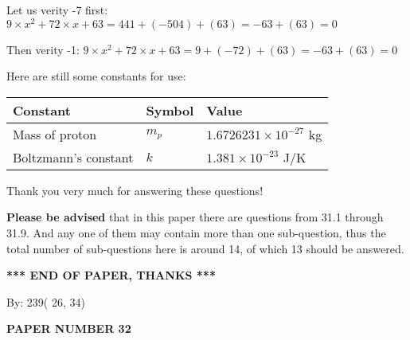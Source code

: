 \documentclass[12pt]{article}
\begin{document}
Let us verity  %
-7 first:
$  %
9 \times x^2  %
+  %
72
                 \times x    %
+  %
63
  = %
441+( %
-504)+( %
63)
  = %
-63+( %
63)
  = %
0
$
 
Then verity  %
-1:
$  %
9 \times x^2  %
+  %
72
                 \times x    %
+  %
63
  = %
9+( %
-72)+( %
63)
  = %
-63+( %
63)
  = %
0
$
 
 
 
   
   
 \vspace{0.2in}
Here are still some constants for use:
 
 
\noindent\begin{tabular}{|l|l|l|}
\hline
Constant & Symbol & Value \\
\hline
 
Mass of proton &
$m_p$ &
 $ 1.6726231 \times 10^{-27} $
kg \\
\hline
 
Boltzmann's constant &
$k$ &
 $ 1.381 \times 10^{-23} $
J/K \\
\hline
 
\end{tabular}
 
Thank you very much for answering these questions!
 
{\textbf{\large{Please be advised}}} that in this paper there are questions from
31.1 through
31.9.
And any one of them may contain more than one sub-question, thus the total number
of sub-questions here is around 14, of which
13 should be answered.
 
   
   
   
   
\vspace{1.0in} 
{\textbf{\large{ *** END OF PAPER, THANKS *** }}} 
   
   
\hspace{1.0in} By: 
         239(         26,          34)
   
   
   
   
\newpage 
\setcounter{page}{ 
    32001 } 
   
   
   
   
 {\textbf{ \Large{ PAPER NUMBER          32 }}}
   
   
\vspace{0.2in}
   
   
   
\end{document}

